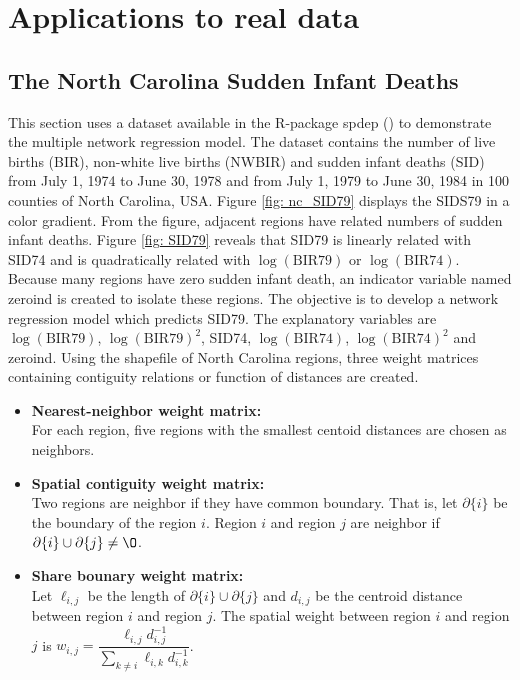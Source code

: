 \documentclass[times, doublespace]{auth}
\begin{document}
\section{Applications to real data}
\subsection{The North Carolina Sudden Infant Deaths}
This section uses a dataset available in the R-package spdep (\cite{R20}) to demonstrate the multiple network regression model. The dataset contains the number of live births (BIR), non-white live births (NWBIR) and sudden infant deaths (SID) from July 1, 1974 to June 30, 1978 and from July 1, 1979 to June 30, 1984 in 100 counties of North Carolina, USA. Figure \ref{fig: nc_SID79} displays the SIDS79 in a color gradient. From the figure, adjacent regions have related numbers of sudden infant deaths. Figure \ref{fig: SID79} reveals that SID79 is linearly related with SID74 and is quadratically related with $\log(\text{BIR79})$ or $\log(\text{BIR74})$. Because many regions have zero sudden infant death, an indicator variable named zeroind is created to isolate these regions. The objective is to develop a network regression model which predicts SID79. The explanatory variables are $\log(\text{BIR79})$, $\log(\text{BIR79})^{2}$, SID74, $\log(\text{BIR74})$, $\log(\text{BIR74})^{2}$ and zeroind. Using the shapefile of North Carolina regions, three weight matrices containing contiguity relations or function of distances are created.
\begin{itemize}
	\item \textbf{Nearest-neighbor weight matrix:} \\
	For each region, five regions with the smallest centoid distances are chosen as neighbors. 
	\item \textbf{Spatial contiguity weight matrix:} \\
	Two regions are neighbor if they have common boundary. That is, let $\partial \{i\}$ be the boundary of the region $i$. Region $i$ and region $j$ are neighbor if $\partial \{i\} \cup \partial \{j\} \ne \O$.
	\item \textbf{Share bounary weight matrix:} \\
	Let $\ell_{i,j}$ be the length of $\partial \{i\} \cup \partial \{j\}$ and $d_{i,j}$ be the centroid distance between region $i$ and region $j$. The spatial weight between region $i$ and region $j$ is $w_{i,j} = \dfrac{\ell_{i,j}d_{i,j}^{-1}}{\sum\limits_{k \ne i} \ell_{i,k}d_{i,k}^{-1}}$.
\end{itemize}
\end{document}
